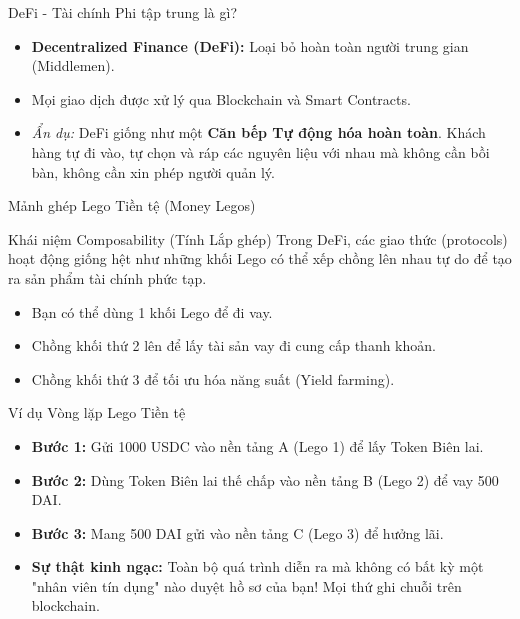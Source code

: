 \documentclass[aspectratio=169, 12pt]{beamer}
\begin{document}
\begin{frame}{DeFi - Tài chính Phi tập trung là gì?}
    \begin{itemize}
        \item \textbf{Decentralized Finance (DeFi):} Loại bỏ hoàn toàn người trung gian (Middlemen).
        \item Mọi giao dịch được xử lý qua Blockchain và Smart Contracts.
        \item \textit{Ẩn dụ:} DeFi giống như một \textbf{Căn bếp Tự động hóa hoàn toàn}. Khách hàng tự đi vào, tự chọn và ráp các nguyên liệu với nhau mà không cần bồi bàn, không cần xin phép người quản lý.
    \end{itemize}
\end{frame}

\begin{frame}{Mảnh ghép Lego Tiền tệ (Money Legos)}
    \begin{block}{Khái niệm Composability (Tính Lắp ghép)}
        Trong DeFi, các giao thức (protocols) hoạt động giống hệt như những khối Lego có thể xếp chồng lên nhau tự do để tạo ra sản phẩm tài chính phức tạp.
    \end{block}
    \begin{itemize}
        \item Bạn có thể dùng 1 khối Lego để đi vay.
        \item Chồng khối thứ 2 lên để lấy tài sản vay đi cung cấp thanh khoản.
        \item Chồng khối thứ 3 để tối ưu hóa năng suất (Yield farming).
    \end{itemize}
\end{frame}

\begin{frame}{Ví dụ Vòng lặp Lego Tiền tệ}
    \begin{itemize}
        \item \textbf{Bước 1:} Gửi 1000 USDC vào nền tảng A (Lego 1) để lấy Token Biên lai.
        \item \textbf{Bước 2:} Dùng Token Biên lai thế chấp vào nền tảng B (Lego 2) để vay 500 DAI.
        \item \textbf{Bước 3:} Mang 500 DAI gửi vào nền tảng C (Lego 3) để hưởng lãi.
        \item \textbf{Sự thật kinh ngạc:} Toàn bộ quá trình diễn ra mà không có bất kỳ một "nhân viên tín dụng" nào duyệt hồ sơ của bạn! Mọi thứ ghi chuỗi trên blockchain.
    \end{itemize}
\end{frame}
\end{document}
